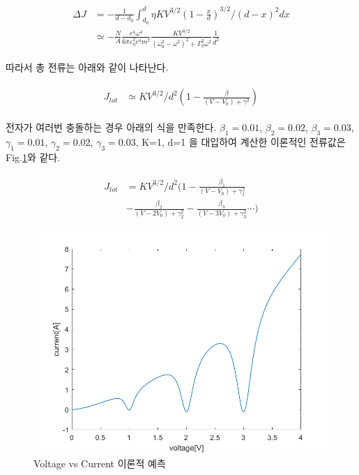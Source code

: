 \documentclass[%
 reprint,
 amsmath,amssymb,
 aps,
]{revtex4-2}
\begin{document}
\begin{align}
	\Delta J &= -\frac{1}{d-d_{0}}\int_{d_{0}}^{d} \eta KV^{3/2}(1-\frac{x}{d})^{3/2}/(d-x)^{2}dx\\
	&\simeq -\frac{N}{A}\frac{e^{4}\omega^{4}}{6\pi\varepsilon_{0}^{2}c^{4}m^{2}}\frac{ KV^{3/2}}{(\omega_{0}^{2}-\omega^{2})^{2}+\Gamma_{0}^{2}\omega^{2}}\frac{1}{d^{2}}
\end{align}


따라서 총 전류는 아래와 같이 나타난다.

\begin{align}
	\begin{aligned}
	J_{tot} &\simeq KV^{3/2}/d^{2}\left(1-\frac{\beta}{(V-V_{0})+\gamma^{2}} \right)
	\end{aligned}
\end{align}

전자가 여러번 충돌하는 경우 아래의 식을 만족한다. $\beta_{1} = 0.01$, $\beta_{2} = 0.02$, $\beta_{3} = 0.03$, $\gamma_{1} = 0.01$, $\gamma_{2} = 0.02$, $\gamma_{3} = 0.03$, K=1, d=1 을 대입하여 계산한 이론적인 전류값은 Fig.\ref{fig:SIM}와 같다.

\begin{align}
	\begin{aligned}
	J_{tot} &= KV^{3/2}/d^{2}\Bigg(1-\frac{\beta_{1}}{(V-V_{0})+\gamma_{1}^{2}} \\
	&-\frac{\beta_{2}}{(V-2V_{0})+\gamma_{2}^{2}} -\frac{\beta_{3}}{(V-3V_{0})+\gamma_{3}^{2}} \cdots \Bigg)
	\end{aligned}
\end{align}

\begin{figure}[htbp]
	\includegraphics[width = 0.85\linewidth]{SIM.png}%
	\caption{\label{fig:SIM}Voltage vs Current 이론적 예측}
\end{figure}
\end{document}
